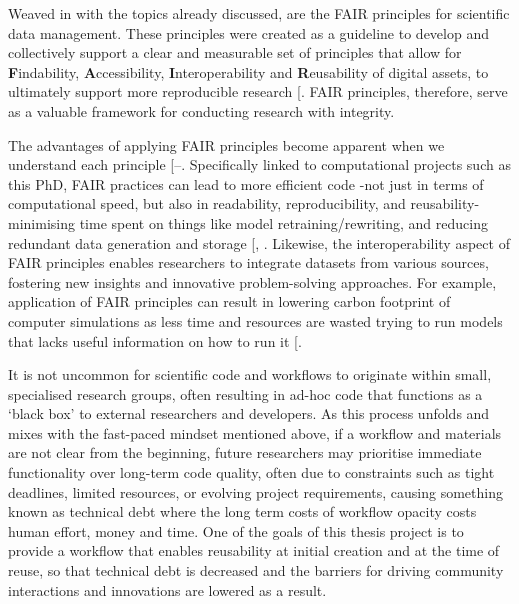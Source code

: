 \documentclass[
  11pt,
  letterpaper,
]{scrreprt}
\begin{document}
Weaved in with the topics already discussed, are the FAIR principles for
scientific data management. These principles were created as a guideline
to develop and collectively support a clear and measurable set of
principles that allow for \textbf{F}indability, \textbf{A}ccessibility,
\textbf{I}nteroperability and \textbf{R}eusability of digital assets, to
ultimately support more reproducible research
{[}\citeproc{ref-wilkinson2016FAIRa}{372}{]}. FAIR principles,
therefore, serve as a valuable framework for conducting research with
integrity.

The advantages of applying FAIR principles become apparent when we
understand each principle
{[}--\citeproc{ref-kim2024Findability}{375}{]}.
Specifically linked to computational projects such as this PhD, FAIR
practices can lead to more efficient code -not just in terms of
computational speed, but also in readability, reproducibility, and
reusability- minimising time spent on things like model
retraining/rewriting, and reducing redundant data generation and storage
{[},
\citeproc{ref-hasselbring2019FAIR}{376}{]}. Likewise, the
interoperability aspect of FAIR principles enables researchers to
integrate datasets from various sources, fostering new insights and
innovative problem-solving approaches. For example, application of FAIR
principles can result in lowering carbon footprint of computer
simulations as less time and resources are wasted trying to run models
that lacks useful information on how to run it
{[}\citeproc{ref-lannelongue2023GREENER}{377}{]}.

It is not uncommon for scientific code and workflows to originate within
small, specialised research groups, often resulting in ad-hoc code that
functions as a `black box' to external researchers and developers. As
this process unfolds and mixes with the fast-paced mindset mentioned
above, if a workflow and materials are not clear from the beginning,
future researchers may prioritise immediate functionality over long-term
code quality, often due to constraints such as tight deadlines, limited
resources, or evolving project requirements, causing something known as
technical debt where the long term costs of workflow opacity costs human
effort, money and time. One of the goals of this thesis project is to
provide a workflow that enables reusability at initial creation and at
the time of reuse, so that technical debt is decreased and the barriers
for driving community interactions and innovations are lowered as a
result.
\end{document}
